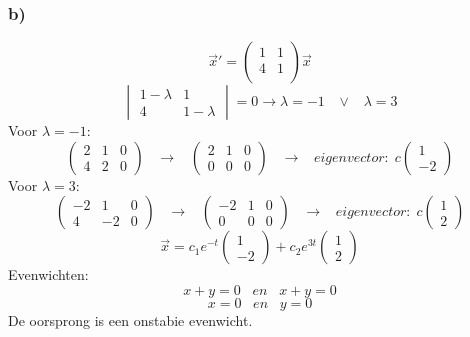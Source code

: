 \documentclass[11pt]{article}
\begin{document}
\subsubsection*{b)}
\[
\vec{x}' =
\begin{pmatrix}
1 & 1\\
4 & 1\\
\end{pmatrix} 
\vec{x}
\]
\[
\begin{vmatrix}
1-\lambda & 1\\
4 & 1-\lambda
\end{vmatrix}
= 0
\longrightarrow
\lambda = -1 \;\;\;\vee\;\;\; \lambda =3
\]
Voor $\lambda = -1$: 
\[
\left(
\begin{array}{cc|c}
2 & 1 & 0 \\
4 & 2 & 0
\end{array}
\right)
\;\;\;\longrightarrow\;\;\;
\left(
\begin{array}{cc|c}
2 & 1 & 0 \\
0 & 0 & 0
\end{array}
\right)
\;\;\;\longrightarrow\;\;\;
eigenvector:\;
c
\begin{pmatrix}
1\\-2
\end{pmatrix}
\]
Voor $\lambda = 3$: 
\[
\left(
\begin{array}{cc|c}
-2 & 1 & 0 \\
4 & -2 & 0
\end{array}
\right)
\;\;\;\longrightarrow\;\;\;
\left(
\begin{array}{cc|c}
-2 & 1 & 0 \\
0 & 0 & 0
\end{array}
\right)
\;\;\;\longrightarrow\;\;\;
eigenvector:\;
c
\begin{pmatrix}
1\\2
\end{pmatrix}
\]
\[
\vec{x} = c_1e^{-t}\begin{pmatrix}
1\\-2
\end{pmatrix}+c_2e^{3t}\begin{pmatrix}
1\\2
\end{pmatrix}
\]
Evenwichten:\\
\[
x+y=0 \;\;\;en\;\;\; x+y=0
\]
\[
x=0 \;\;\;en\;\;\; y=0
\]
De oorsprong is een onstabie evenwicht.
\end{document}
